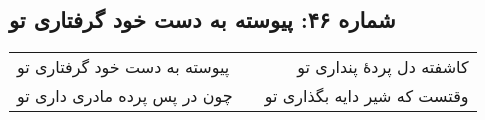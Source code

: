 \begin{center}
\section*{شماره ۴۶: پیوسته به دست خود گرفتاری تو}
\label{sec:046}
\begin{longtable}{l p{0.5cm} r}
پیوسته به دست خود گرفتاری تو
&&
کاشفته دل پردهٔ پنداری تو
\\
چون در پس پرده مادری داری تو
&&
وقتست که شیر دایه بگذاری تو
\\
\end{longtable}
\end{center}
